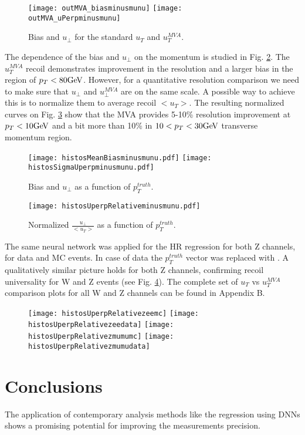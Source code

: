	\begin{figure}[tph]
	\centering
	\texttt{[image: outMVA\_biasminusmunu]}%
	\texttt{[image: outMVA\_uPerpminusmunu]}
	\caption{Bias and $u_{\perp}$ for the standard $u_T$ and $u_T^{MVA}$.}
	\label{fig:mva_bias_uperp}
\end{figure}
The dependence of the bias and $u_{\perp}$ on the momentum is studied in Fig. \ref{fig:biasuperp_vs_pt}. The $u_T^{MVA}$ recoil demonstrates improvement in the resolution and a larger bias in the region of $p_T<80\text{Ge\kern -0.1em V}$. However, for a quantitative resolution comparison we need to make sure that $u_{\perp}$ and $u_{\perp}^{MVA}$ are on the same scale. A possible way to achieve this is to normalize them to average recoil $<u_T>$. The resulting normalized curves on Fig. \ref{fig:uperp_relative} show that the MVA provides 5-10\% resolution improvement at $p_T<10\text{Ge\kern -0.1em V}$ and a bit more than 10\% in $10<p_T<30\text{Ge\kern -0.1em V}$ transverse momentum region. \\
	\begin{figure}[tph]
	\centering
	\texttt{[image: histosMeanBiasminusmunu.pdf]}%
	\texttt{[image: histosSigmaUperpminusmunu.pdf]}
	\caption{Bias and $u_{\perp}$ as a function of $p_T^{truth}$.}
	\label{fig:biasuperp_vs_pt}
\end{figure}

	\begin{figure}[tph]
	\centering
	\texttt{[image: histosUperpRelativeminusmunu.pdf]}%
	\caption{Normalized $\frac{u_{\perp}}{<u_T>}$  as a function of $p_T^{truth}$.}
	\label{fig:uperp_relative}
\end{figure}
The same neural network was applied for the HR regression for both Z channels, for data and MC events. In case of data the $p_T^{truth}$ vector was replaced with \ptll. A qualitatively similar picture holds for both Z channels, confirming recoil universality for W and Z events (see Fig. \ref{fig:mva_Zbenchmark}). The complete set of $u_T$ vs $u_T^{MVA}$ comparison plots for all W and Z channels can be found in Appendix B.
	\begin{figure}[tph]
	\centering
	\texttt{[image: histosUperpRelativezeemc]}%
	\texttt{[image: histosUperpRelativezeedata]}
	\texttt{[image: histosUperpRelativezmumumc]}%
	\texttt{[image: histosUperpRelativezmumudata]}
	\caption{}
	\label{fig:mva_Zbenchmark}
\end{figure}

\section{Conclusions}
The application of contemporary analysis methods like the regression using DNNs shows a promising potential for improving the measurements precision. 